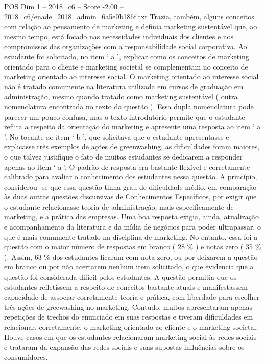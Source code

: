\begin{textsample}{POS Dim 1 – 2018\_c6 – Score -2.00 – 2018\_c6/enade\_2018\_admin\_6a5e0b186f.txt}
Trazia, também, alguns conceitos com relação ao pensamento de marketing e definia marketing sustentável que, ao mesmo tempo, está focado nas necessidades individuais dos clientes e nos compromissos das organizações com a responsabilidade social corporativa.
Ao estudante foi solicitado, no item ‘ a ’, explicar como os conceitos de marketing orientado para o cliente e marketing societal se complementam no conceito de marketing orientado ao interesse social.
O marketing orientado ao interesse social não é tratado comumente na literatura utilizada em cursos de graduação em administração, mesmo quando tratado como marketing sustentável ( outra nomenclatura encontrada no texto da questão ).
Essa dupla nomenclatura pode parecer um pouco confusa, mas o texto introdutório permite que o estudante reflita a respeito da orientação do marketing e apresente uma resposta ao item ‘ a ’.
No tocante ao item ‘ b ’, que solicitava que o estudante apresentasse e explicasse três exemplos de ações de greenwashing, as dificuldades foram maiores, o que talvez justifique o fato de muitos estudantes se dedicarem a responder apenas ao item ‘ a ’.
O padrão de resposta era bastante flexível e corretamente calibrado para avaliar o conhecimento dos estudantes nessa questão.
A princípio, considerou -se que essa questão tinha grau de dificuldade médio, em comparação às duas outras questões discursivas de Conhecimentos Específicos, por exigir que o estudante relacionasse teoria de administração, mais especificamente de marketing, e a prática das empresas.
Uma boa resposta exigia, ainda, atualização e acompanhamento da literatura e da mídia de negócios para poder ultrapassar, o que é mais comumente tratado na disciplina de marketing.
No entanto, essa foi a questão com o maior número de respostas em branco ( 28 \% ) e notas zero ( 35 \% ).
Assim, 63 \% dos estudantes ficaram com nota zero, ou por deixarem a questão em branco ou por não acertarem nenhum item solicitado, o que evidencia que a questão foi considerada difícil pelos estudantes.
A questão permitia que os estudantes refletissem a respeito de conceitos bastante atuais e manifestassem capacidade de associar corretamente teoria e prática, com liberdade para escolher três ações de greewashing no marketing.
Contudo, muitos apresentaram apenas repetições de trechos do enunciado em suas respostas e tiveram dificuldades em relacionar, corretamente, o marketing orientado ao cliente e o marketing societal.
Houve casos em que os estudantes relacionaram marketing social às redes sociais e trataram da expansão das redes sociais e suas supostas influências sobre os consumidores.

\end{textsample}
